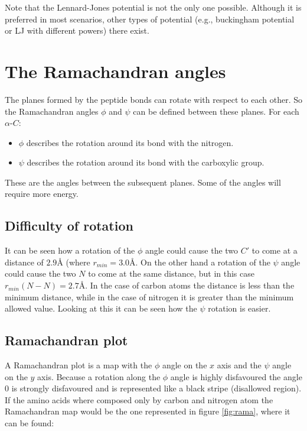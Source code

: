 	Note that the Lennard-Jones potential is not the only one possible.
	Although it is preferred in most scenarios, other types of potential (e.g., buckingham potential or LJ with different powers) there exist.

\section{The Ramachandran angles}
The planes formed by the peptide bonds can rotate with respect to each other.
So the Ramachandran angles $\phi$ and $\psi$ can be defined between these planes.
For each $\alpha$-$C$:

\begin{multicols}{2}
	\begin{itemize}
		\item $\phi$ describes the rotation around its bond with the nitrogen.
		\item $\psi$ describes the rotation around its bond with the carboxylic group.
	\end{itemize}
\end{multicols}

These are the angles between the subsequent planes.
Some of the angles will require more energy.

	\subsection{Difficulty of rotation}
	It can be seen how a rotation of the $\phi$ angle could cause the two $C'$ to come at a distance of $2.9\si{\angstrom}$ (where $r_{min} = 3.0\si{\angstrom}$.
	On the other hand a rotation of the $\psi$ angle could cause the two $N$ to come at the same distance, but in this case $r_{min}(N-N) = 2.7\si{\angstrom}$.
	In the case of carbon atoms the distance is less than the minimum distance, while in the case of nitrogen it is greater than the minimum allowed value.
	Looking at this it can be seen how the $\psi$ rotation is easier.

	\subsection{Ramachandran plot}
	A Ramachandran plot is a map with the $\phi$ angle on the $x$ axis and the $\psi$ angle on the $y$ axis.
	Because a rotation along the $\phi$ angle is highly disfavoured the angle $0$ is strongly disfavoured and is represented like a black stripe (disallowed region).
	If the amino acids where composed only by carbon and nitrogen atom the Ramachandran map would be the one represented in figure \ref{fig:rama}, where it can be found:

